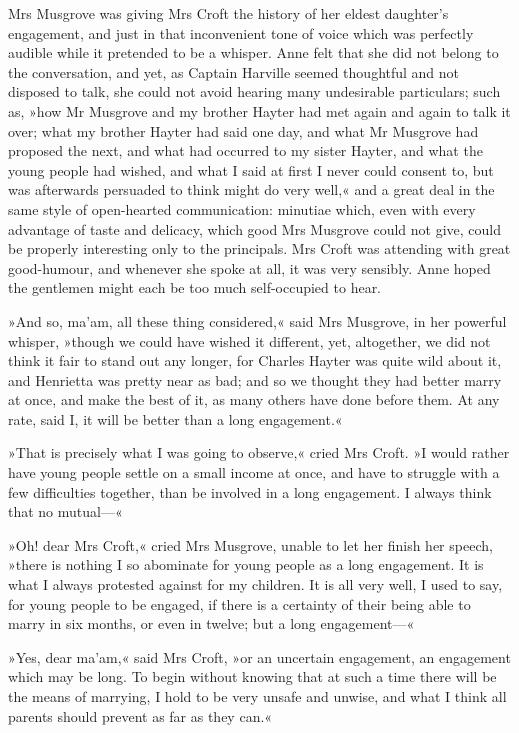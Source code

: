 Mrs Musgrove was giving Mrs Croft the history of her eldest daughter's engagement, and just in that inconvenient tone of voice which was perfectly audible while it pretended to be a whisper. Anne felt that she did not belong to the conversation, and yet, as Captain Harville seemed thoughtful and not disposed to talk, she could not avoid hearing many undesirable particulars; such as, »how Mr Musgrove and my brother Hayter had met again and again to talk it over; what my brother Hayter had said one day, and what Mr Musgrove had proposed the next, and what had occurred to my sister Hayter, and what the young people had wished, and what I said at first I never could consent to, but was afterwards persuaded to think might do very well,« and a great deal in the same style of open-hearted communication: minutiae which, even with every advantage of taste and delicacy, which good Mrs Musgrove could not give, could be properly interesting only to the principals. Mrs Croft was attending with great good-humour, and whenever she spoke at all, it was very sensibly. Anne hoped the gentlemen might each be too much self-occupied to hear.

»And so, ma'am, all these thing considered,« said Mrs Musgrove, in her powerful whisper, »though we could have wished it different, yet, altogether, we did not think it fair to stand out any longer, for Charles Hayter was quite wild about it, and Henrietta was pretty near as bad; and so we thought they had better marry at once, and make the best of it, as many others have done before them. At any rate, said I, it will be better than a long engagement.«

»That is precisely what I was going to observe,« cried Mrs Croft. »I would rather have young people settle on a small income at once, and have to struggle with a few difficulties together, than be involved in a long engagement. I always think that no mutual—«

»Oh! dear Mrs Croft,« cried Mrs Musgrove, unable to let her finish her speech, »there is nothing I so abominate for young people as a long engagement. It is what I always protested against for my children. It is all very well, I used to say, for young people to be engaged, if there is a certainty of their being able to marry in six months, or even in twelve; but a long engagement—«

»Yes, dear ma'am,« said Mrs Croft, »or an uncertain engagement, an engagement which may be long. To begin without knowing that at such a time there will be the means of marrying, I hold to be very unsafe and unwise, and what I think all parents should prevent as far as they can.«

